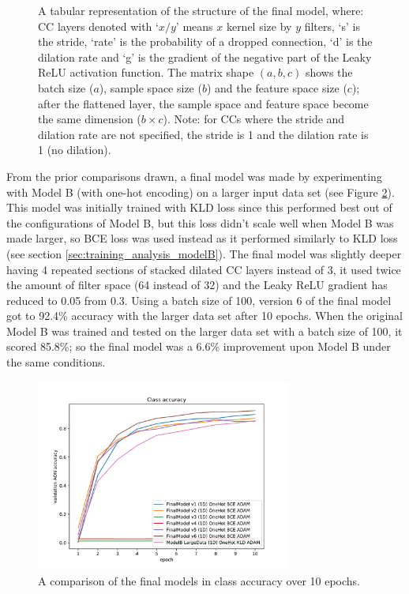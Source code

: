 \documentclass[12pt]{article}
\begin{document}
\begin{figure}[H]
\begin{scriptsize}
\begin{tabular}{l|l|l|l|l|l|l|l|l|}
                \bottomrule
            \end{tabular}
        \end{scriptsize}
        \caption{\footnotesize{A tabular representation of the structure of the final model, where: CC layers denoted with `$x/y$' means $x$ kernel size by $y$ filters, `s' is the stride, `rate' is the probability of a dropped connection, `d' is the dilation rate and `g' is the gradient of the negative part of the Leaky ReLU activation function. The matrix shape $(a, b, c)$ shows the batch size ($a$), sample space size ($b$) and the feature space size ($c$); after the flattened layer, the sample space and feature space become the same dimension ($b\times c$). Note: for CCs where the stride and dilation rate are not specified, the stride is 1 and the dilation rate is 1 (no dilation).}}
        \label{fig:final_model}
    \end{figure}
	
	From the prior comparisons drawn, a final model was made by experimenting with Model B (with one-hot encoding) on a larger input data set (see Figure \ref{fig:final_model_comparison}). This model was initially trained with KLD loss since this performed best out of the configurations of Model B, but this loss didn't scale well when Model B was made larger, so BCE loss was used instead as it performed similarly to KLD loss (see section \ref{sec:training_analysis_modelB}). The final model was slightly deeper having 4 repeated sections of stacked dilated CC layers instead of 3, it used twice the amount of filter space (64 instead of 32) and the Leaky ReLU gradient has reduced to 0.05 from 0.3. Using a batch size of 100, version 6 of the final model got to 92.4\% accuracy with the larger data set after 10 epochs. When the original Model B was trained and tested on the larger data set with a batch size of 100, it scored 85.8\%; so the final model was a 6.6\% improvement upon Model B under the same conditions.\medskip
	
	\begin{figure}[H]
	    \centering
	    \includegraphics[width=0.75\textwidth]{figures/training_plots/FinalModelAccuracyComparison.pdf}
	    \caption{A comparison of the final models in class accuracy over 10 epochs.}
	    \label{fig:final_model_comparison}
	\end{figure}
	
\end{document}
